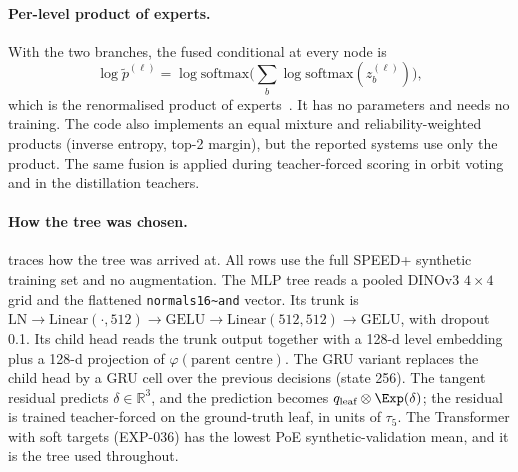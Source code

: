 \paragraph{Per-level product of experts.}
With the two branches, the fused conditional at every node is
\begin{equation}
  \log\tilde p^{(\ell)}=\log\mathrm{softmax}\Big(\textstyle\sum_{b}\log\mathrm{softmax}(z_b^{(\ell)})\Big),
\end{equation}
which is the renormalised product of experts~\cite{hinton2002poe}. It has no parameters and needs no training. The code also implements an equal mixture and reliability-weighted products (inverse entropy, top-2 margin), but the reported systems use only the product. The same fusion is applied during teacher-forced scoring in orbit voting and in the distillation teachers.

\paragraph{How the tree was chosen.}
 traces how the tree was arrived at. All rows use the full SPEED+ synthetic training set and no augmentation. The MLP tree reads a pooled DINOv3 $4\times4$ grid and the flattened \texttt{normals16\textasciitilde and} vector. Its trunk is $\mathrm{LN}\to\mathrm{Linear}(\cdot,512)\to\mathrm{GELU}\to\mathrm{Linear}(512,512)\to\mathrm{GELU}$, with dropout 0.1. Its child head reads the trunk output together with a 128-d level embedding plus a 128-d projection of $\varphi(\text{parent centre})$. The GRU variant replaces the child head by a GRU cell over the previous decisions (state 256). The tangent residual predicts $\delta\in\mathbb{R}^3$, and the prediction becomes $q_{\text{leaf}}\otimes\Exp(\delta)$; the residual is trained teacher-forced on the ground-truth leaf, in units of $\tau_5$. The Transformer with soft targets (EXP-036) has the lowest PoE synthetic-validation mean, and it is the tree used throughout.

